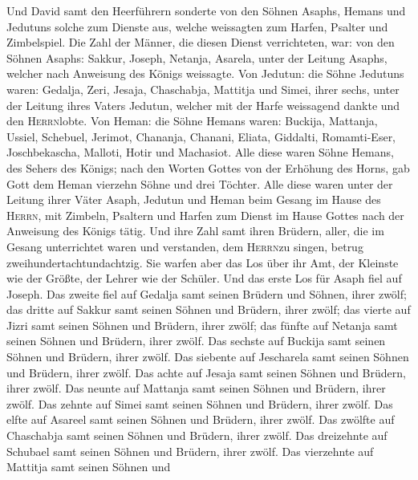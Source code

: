  Und David samt den Heerführern sonderte von den Söhnen
Asaphs, Hemans und Jedutuns solche zum Dienste aus, welche weissagten
zum Harfen, Psalter und Zimbelspiel. Die Zahl der Männer, die diesen
Dienst verrichteten, war:  von den Söhnen Asaphs: Sakkur,
Joseph, Netanja, Asarela, unter der Leitung Asaphs, welcher nach
Anweisung des Königs weissagte.  Von Jedutun: die Söhne
Jedutuns waren: Gedalja, Zeri, Jesaja, Chaschabja, Mattitja und Simei,
ihrer sechs, unter der Leitung ihres Vaters Jedutun, welcher mit der
Harfe weissagend dankte und den \textsc{Herrn}lobte.  Von
Heman: die Söhne Hemans waren: Buckija, Mattanja, Ussiel, Schebuel,
Jerimot, Chananja, Chanani, Eliata, Giddalti, Romamti-Eser,
Joschbekascha, Malloti, Hotir und Machasiot.  Alle diese
waren Söhne Hemans, des Sehers des Königs; nach den Worten Gottes von
der Erhöhung des Horns, gab Gott dem Heman vierzehn Söhne und drei
Töchter.  Alle diese waren unter der Leitung ihrer Väter
Asaph, Jedutun und Heman beim Gesang im Hause des \textsc{Herrn}, mit
Zimbeln, Psaltern und Harfen zum Dienst im Hause Gottes nach der
Anweisung des Königs tätig.  Und ihre Zahl samt ihren
Brüdern, aller, die im Gesang unterrichtet waren und verstanden, dem
\textsc{Herrn}zu singen, betrug zweihundertachtundachtzig.
 Sie warfen aber das Los über ihr Amt, der Kleinste wie
der Größte, der Lehrer wie der Schüler.  Und das erste Los
für Asaph fiel auf Joseph. Das zweite fiel auf Gedalja samt seinen
Brüdern und Söhnen, ihrer zwölf;  das dritte auf Sakkur
samt seinen Söhnen und Brüdern, ihrer zwölf;  das vierte
auf Jizri samt seinen Söhnen und Brüdern, ihrer zwölf; 
das fünfte auf Netanja samt seinen Söhnen und Brüdern, ihrer zwölf.
 Das sechste auf Buckija samt seinen Söhnen und Brüdern,
ihrer zwölf.  Das siebente auf Jescharela samt seinen
Söhnen und Brüdern, ihrer zwölf.  Das achte auf Jesaja
samt seinen Söhnen und Brüdern, ihrer zwölf.  Das neunte
auf Mattanja samt seinen Söhnen und Brüdern, ihrer zwölf.
 Das zehnte auf Simei samt seinen Söhnen und Brüdern,
ihrer zwölf.  Das elfte auf Asareel samt seinen Söhnen
und Brüdern, ihrer zwölf.  Das zwölfte auf Chaschabja
samt seinen Söhnen und Brüdern, ihrer zwölf.  Das
dreizehnte auf Schubael samt seinen Söhnen und Brüdern, ihrer zwölf.
 Das vierzehnte auf Mattitja samt seinen Söhnen und
